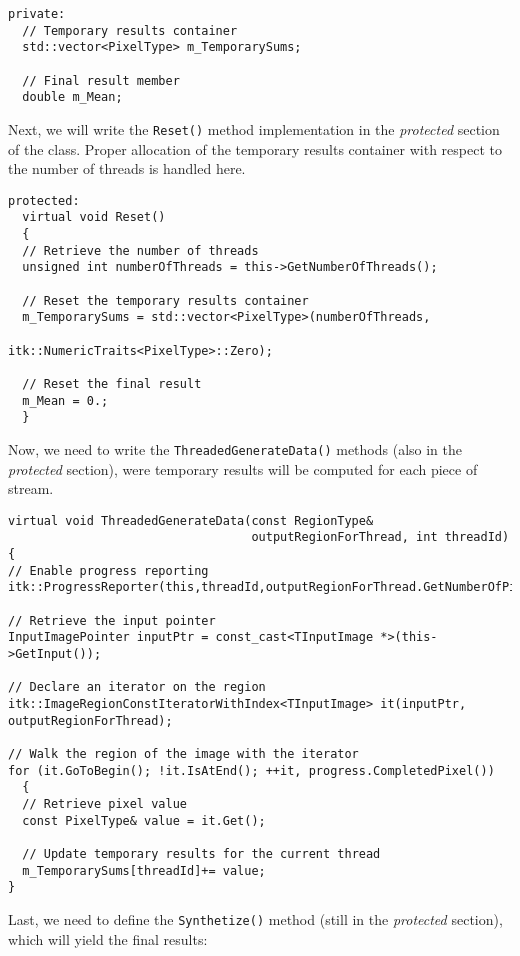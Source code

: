 \begin{lstlisting}
private:
  // Temporary results container
  std::vector<PixelType> m_TemporarySums;

  // Final result member
  double m_Mean;
\end{lstlisting}

Next, we will write the \verb?Reset()? method implementation in the
\emph{protected} section of the class. Proper allocation of the
temporary results container with respect to the number of threads is
handled here.


\begin{lstlisting}
protected:
  virtual void Reset()
  {
  // Retrieve the number of threads
  unsigned int numberOfThreads = this->GetNumberOfThreads();

  // Reset the temporary results container
  m_TemporarySums = std::vector<PixelType>(numberOfThreads,
                                           itk::NumericTraits<PixelType>::Zero);

  // Reset the final result
  m_Mean = 0.;
  }
\end{lstlisting}

Now, we need to write the \verb?ThreadedGenerateData()? methods (also
in the \emph{protected} section), were
temporary results will be computed for each piece of stream.

\begin{lstlisting}
virtual void ThreadedGenerateData(const RegionType&
                                  outputRegionForThread, int threadId)
{
// Enable progress reporting
itk::ProgressReporter(this,threadId,outputRegionForThread.GetNumberOfPixels());

// Retrieve the input pointer
InputImagePointer inputPtr = const_cast<TInputImage *>(this->GetInput());

// Declare an iterator on the region
itk::ImageRegionConstIteratorWithIndex<TInputImage> it(inputPtr,
outputRegionForThread);

// Walk the region of the image with the iterator
for (it.GoToBegin(); !it.IsAtEnd(); ++it, progress.CompletedPixel())
  {
  // Retrieve pixel value
  const PixelType& value = it.Get();

  // Update temporary results for the current thread
  m_TemporarySums[threadId]+= value;
}

\end{lstlisting}

Last, we need to define the \verb?Synthetize()? method (still in the
\emph{protected} section), which will yield the final results:


